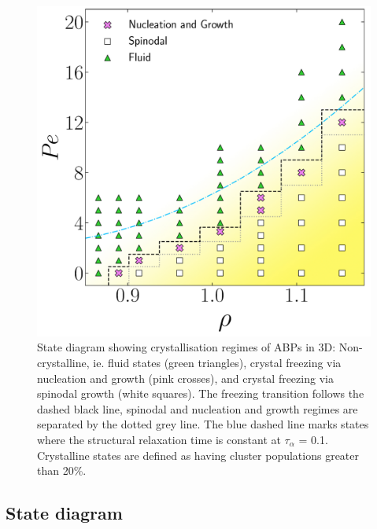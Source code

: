\begin{figure}
\includegraphics[width=0.8\linewidth]{figAprilFools/figStateDiagram.pdf}
\caption[State diagram for the crystallisation of active Brownian spheres]{State diagram showing crystallisation regimes of ABPs in 3D: Non-crystalline, ie. fluid states (green triangles), crystal freezing via nucleation and growth (pink crosses), and crystal freezing via spinodal growth (white squares). The freezing transition follows the dashed black line, spinodal and nucleation and growth regimes are separated by the dotted grey line. The blue dashed line marks states where the structural relaxation time is constant at $\tau_{\alpha}$ = 0.1. Crystalline states are defined as having cluster populations greater than 20\%.}
\label{figStateDiagram}
\end{figure}






\subsection{State diagram}
\label{sectionStateDiagram}


